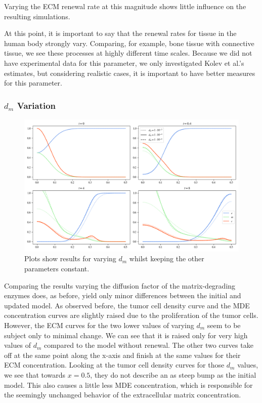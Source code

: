 Varying the ECM renewal rate at this magnitude shows little influence on the resulting simulations.
 
At this point, it is important to say that the renewal rates for tissue in the human body strongly vary. Comparing, for example, bone tissue with connective tissue, we see these processes at highly different time scales. Because we did not have experimental data for this parameter, we only investigated Kolev et al.'s estimates, but considering realistic cases, it is important to have better measures for this parameter.

\subsubsection*{$d_m$ Variation}
\begin{figure}[h!]
    \centering
    \includegraphics[width=\textwidth]{resources/images/prolif_dm_variation.png}
    \caption{Plots show results for varying $d_m$ whilst keeping the other parameters constant.}
    \label{fig:prolif_dm_variation}
\end{figure}

Comparing the results varying the diffusion factor of the matrix-degrading enzymes does, as before, yield only minor differences between the initial and updated model. As observed before, the tumor cell density curve and the MDE concentration curves are slightly raised due to the proliferation of the tumor cells. However, the ECM curves for the two lower values of varying $d_m$ seem to be subject only to minimal change. We can see that it is raised only for very high values of $d_m$ compared to the model without renewal. The other two curves take off at the same point along the x-axis and finish at the same values for their ECM concentration. Looking at the tumor cell density curves for those $d_m$ values, we see that towards $x=0.5$, they do not describe an as steep bump as the initial model. This also causes a little less MDE concentration, which is responsible for the seemingly unchanged behavior of the extracellular matrix concentration.

